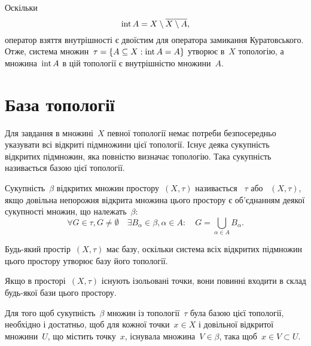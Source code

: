 \begin{corollary}
    Оскільки \[\operatorname{int} A = X \setminus \overline{X \setminus A}, \] оператор взяття внутрішності є двоїстим для оператора замикання Куратовського. Отже, система множин~$\tau = \{A \subseteq X: \operatorname{int} A = A\}$ утворює в~$X$ топологію, а множина~$\operatorname{int} A$ в цій топології є внутрішністю множини~$A$.
\end{corollary}

\section{База топології}

Для завдання в множині~$X$ певної топології немає потреби безпосередньо указувати всі відкриті підмножини цієї топології. Існує деяка сукупність відкритих підмножин, яка повністю визначає топологію. Така сукупність називається базою цієї топології.

\begin{definition}
    Сукупність~$\beta$ відкритих множин простору~$(X, \tau)$ називається ~$\tau$ або ~$(X, \tau)$, якщо довільна непорожня відкрита множина цього простору є об'єднанням деякої сукупності множин, що належать~$\beta$: \[ \forall G \in \tau, G \ne \emptyset \quad \exists B_\alpha \in \beta, \alpha \in A: \quad G = \bigcup_{\alpha \in A} B_\alpha. \]
\end{definition}

\begin{remark}
    Будь-який простір~$(X, \tau)$ має базу, оскільки система всіх відкритих підмножин цього простору утворює базу його топології.
\end{remark}

\begin{remark}
    Якщо в просторі~$(X, \tau)$ існують ізольовані точки, вони повинні входити в склад будь-якої бази цього простору.
\end{remark}

\begin{theorem}
    Для того щоб сукупність~$\beta$ множин із топології~$\tau$ була базою цієї топології, необхідно і достатньо, щоб для кожної точки~$x \in X$ і довільної відкритої множини~$U$, що містить точку~$x$, існувала множина~$V \in \beta$, така щоб~$x \in V \subset U$.
\end{theorem}

